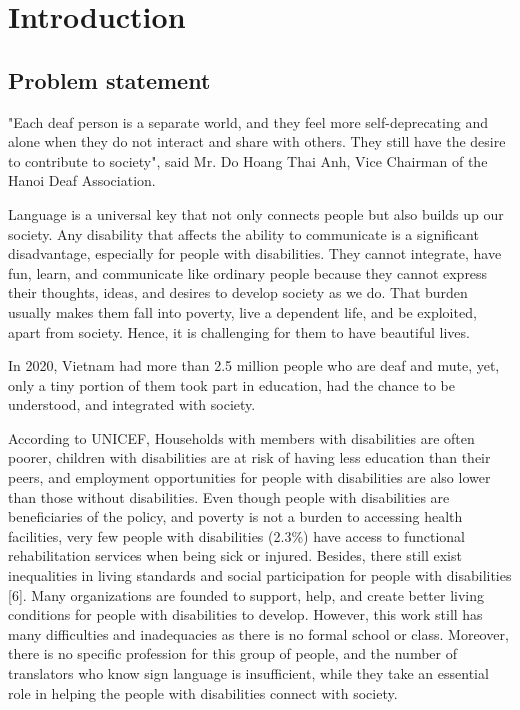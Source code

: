 \chapter{Introduction}
	
\section{Problem statement}

"Each deaf person is a separate world, and they feel more self-deprecating and alone when they do not interact and share with others. They still have the desire to contribute to society", said Mr. Do Hoang Thai Anh, Vice Chairman of the Hanoi Deaf Association.

Language is a universal key that not only connects people but also builds up our society. Any disability that affects the ability to communicate is a significant disadvantage, especially for people with disabilities. They cannot integrate, have fun, learn, and communicate like ordinary people because they cannot express their thoughts, ideas, and desires to develop society as we do. That burden usually makes them fall into poverty, live a dependent life, and be exploited, apart from society. Hence, it is challenging for them to have beautiful lives.

In 2020, Vietnam had more than 2.5 million people who are deaf and mute, yet, only a tiny portion of them took part in education, had the chance to be understood, and integrated with society.

According to UNICEF, Households with members with disabilities are often poorer, children with disabilities are at risk of having less education than their peers, and employment opportunities for people with disabilities are also lower than those without disabilities. Even though people with disabilities are beneficiaries of the policy, and poverty is not a burden to accessing health facilities, very few people with disabilities (2.3\%) have access to functional rehabilitation services when being sick or injured. Besides, there still exist inequalities in living standards and social participation for people with disabilities [6]. Many organizations are founded to support, help, and create better living conditions for people with disabilities to develop. However, this work still has many difficulties and inadequacies as there is no formal school or class. Moreover, there is no specific profession for this group of people, and the number of translators who know sign language is insufficient, while they take an essential role in helping the people with disabilities connect with society.


